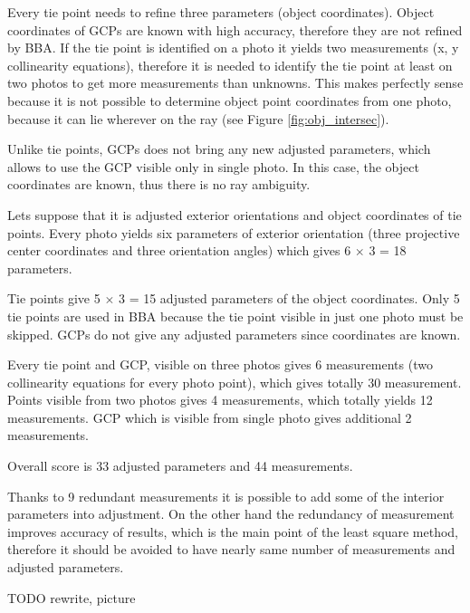 \documentclass[a4paper,12pt]{article}
\begin{document}

Every tie point needs to refine three parameters (object coordinates). 
Object coordinates of GCPs are known with high accuracy, therefore they are not refined by BBA. 
If the tie point is identified on a photo it yields two measurements (x, y collinearity equations), 
therefore it is needed to identify the tie point at least on two photos to get more measurements 
than unknowns. This makes perfectly sense because it is not possible to determine object point coordinates from one photo,
because it can lie wherever on the ray (see Figure \ref{fig:obj_intersec}).

Unlike tie points, GCPs does not bring any new adjusted parameters, which 
allows to use the GCP visible only in single photo. In this case, the object coordinates 
are known, thus there is no ray ambiguity. 

Lets suppose that it is adjusted exterior orientations and object coordinates of tie points.  
Every photo yields six parameters of exterior orientation (three projective center coordinates and three orientation angles) 
which gives 6 $\times$ 3 = 18 parameters. 

Tie points give 5 $\times$ 3 = 15 adjusted parameters of the object coordinates. 
Only 5 tie points are used in BBA because the tie point visible in just one photo must be skipped.
GCPs do not give any adjusted parameters since coordinates are known.

Every tie point and GCP, visible on three photos gives 6 measurements (two collinearity equations for every photo point),
which gives totally 30 measurement.
Points visible from two photos gives 4 measurements, which totally yields 12 measurements.
GCP which is visible from single photo gives additional 2 measurements.

Overall score is 33 adjusted parameters and 44 measurements.

Thanks to 9 redundant measurements it is possible to add some of the interior parameters into adjustment.  
On the other hand the redundancy of measurement improves accuracy of results, which is the main point of the least square method,
therefore it should be avoided to have nearly same number of measurements and adjusted parameters.

TODO rewrite, picture
\end{document}
